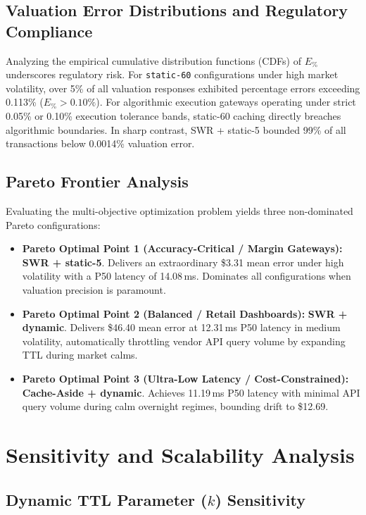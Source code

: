 \documentclass[11pt,a4paper]{article}
\begin{document}
\subsection{Valuation Error Distributions and Regulatory Compliance}

Analyzing the empirical cumulative distribution functions (CDFs) of $E_{\%}$ underscores regulatory risk. For \texttt{static-60} configurations under high market volatility, over 5\% of all valuation responses exhibited percentage errors exceeding 0.113\% ($E_{\%} > 0.10\%$). For algorithmic execution gateways operating under strict 0.05\% or 0.10\% execution tolerance bands, static-60 caching directly breaches algorithmic boundaries. In sharp contrast, SWR + static-5 bounded 99\% of all transactions below 0.0014\% valuation error.

\subsection{Pareto Frontier Analysis}

Evaluating the multi-objective optimization problem yields three non-dominated Pareto configurations:
\begin{itemize}
  \item \textbf{Pareto Optimal Point 1 (Accuracy-Critical / Margin Gateways):} \textbf{SWR + static-5}. Delivers an extraordinary \$3.31 mean error under high volatility with a P50 latency of 14.08\,ms. Dominates all configurations when valuation precision is paramount.
  \item \textbf{Pareto Optimal Point 2 (Balanced / Retail Dashboards):} \textbf{SWR + dynamic}. Delivers \$46.40 mean error at 12.31\,ms P50 latency in medium volatility, automatically throttling vendor API query volume by expanding TTL during market calms.
  \item \textbf{Pareto Optimal Point 3 (Ultra-Low Latency / Cost-Constrained):} \textbf{Cache-Aside + dynamic}. Achieves 11.19\,ms P50 latency with minimal API query volume during calm overnight regimes, bounding drift to \$12.69.
\end{itemize}

\section{Sensitivity and Scalability Analysis}
\label{sec:sensitivity}

\subsection{Dynamic TTL Parameter ($k$) Sensitivity}
\end{document}
